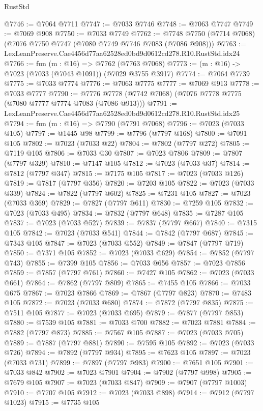 \begin{lexlean}{RustStd}
\begin{coremodule}
@7746 := @7064 @7711
@7747 := @7033 @7746
@7748 := @7063 @7747
@7749 := @7069 @908
@7750 := @7033 @7749
@7762 := @7748 @7750 (@7714 @7068) (@7076 @7750 @7747 (@7080 @7749 @7746 @7083 (@7086 @908)))
@7763 := LexLeanPreserve.Cae4456d77aa62528ed0bd9d0612cd278.R10.RustStd.idx24
@7766 := fun (m : @16) => @7762 (@7763 @7068)
@7773 := (m : @16) -> @7023 (@7033 (@7043 @1091)) (@7029 @3755 @3917)
@7774 := @7064 @7739
@7775 := @7033 @7774
@7776 := @7063 @7775
@7777 := @7069 @913
@7778 := @7033 @7777
@7790 := @7776 @7778 (@7742 @7068) (@7076 @7778 @7775 (@7080 @7777 @7774 @7083 (@7086 @913)))
@7791 := LexLeanPreserve.Cae4456d77aa62528ed0bd9d0612cd278.R10.RustStd.idx25
@7794 := fun (m : @16) => @7790 (@7791 @7068)
@7796 := @7023 (@7033 @105)
@7797 := @1445 @98
@7799 := @7796 (@7797 @168)
@7800 := @7091 @105
@7802 := @7023 (@7033 @22)
@7804 := @7802 (@7797 @272)
@7805 := @7119 @105
@7806 := @7033 @30
@7807 := @7023 @7806
@7809 := @7807 (@7797 @329)
@7810 := @7147 @105
@7812 := @7023 (@7033 @37)
@7814 := @7812 (@7797 @347)
@7815 := @7175 @105
@7817 := @7023 (@7033 @126)
@7819 := @7817 (@7797 @356)
@7820 := @7203 @105
@7822 := @7023 (@7033 @339)
@7824 := @7822 (@7797 @602)
@7825 := @7231 @105
@7827 := @7023 (@7033 @369)
@7829 := @7827 (@7797 @611)
@7830 := @7259 @105
@7832 := @7023 (@7033 @495)
@7834 := @7832 (@7797 @648)
@7835 := @7287 @105
@7837 := @7023 (@7033 @527)
@7839 := @7837 (@7797 @667)
@7840 := @7315 @105
@7842 := @7023 (@7033 @541)
@7844 := @7842 (@7797 @687)
@7845 := @7343 @105
@7847 := @7023 (@7033 @552)
@7849 := @7847 (@7797 @719)
@7850 := @7371 @105
@7852 := @7023 (@7033 @629)
@7854 := @7852 (@7797 @743)
@7855 := @7399 @105
@7856 := @7033 @656
@7857 := @7023 @7856
@7859 := @7857 (@7797 @761)
@7860 := @7427 @105
@7862 := @7023 (@7033 @661)
@7864 := @7862 (@7797 @809)
@7865 := @7455 @105
@7866 := @7033 @675
@7867 := @7023 @7866
@7869 := @7867 (@7797 @823)
@7870 := @7483 @105
@7872 := @7023 (@7033 @680)
@7874 := @7872 (@7797 @835)
@7875 := @7511 @105
@7877 := @7023 (@7033 @695)
@7879 := @7877 (@7797 @853)
@7880 := @7539 @105
@7881 := @7033 @700
@7882 := @7023 @7881
@7884 := @7882 (@7797 @873)
@7885 := @7567 @105
@7887 := @7023 (@7033 @705)
@7889 := @7887 (@7797 @881)
@7890 := @7595 @105
@7892 := @7023 (@7033 @726)
@7894 := @7892 (@7797 @934)
@7895 := @7623 @105
@7897 := @7023 (@7033 @731)
@7899 := @7897 (@7797 @983)
@7900 := @7651 @105
@7901 := @7033 @842
@7902 := @7023 @7901
@7904 := @7902 (@7797 @998)
@7905 := @7679 @105
@7907 := @7023 (@7033 @847)
@7909 := @7907 (@7797 @1003)
@7910 := @7707 @105
@7912 := @7023 (@7033 @898)
@7914 := @7912 (@7797 @1023)
@7915 := @7735 @105

\end{coremodule}
\end{lexlean}
